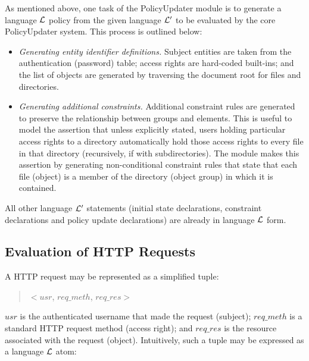 \documentclass[11pt]{report}
\begin{document}
        As mentioned above, one task of the PolicyUpdater module is to
        generate a language ${\cal L}$ policy from the given language
        ${\cal L'}$ to be evaluated by the core PolicyUpdater system.
        This process is outlined below:

        \begin{itemize}
          \item
            {\em Generating entity identifier definitions.} Subject entities are
            taken from the authentication (password) table; access rights are
            hard-coded built-ins; and the list of objects are generated by
            traversing the document root for files and directories.
          \item
            {\em Generating additional constraints.} Additional constraint
            rules are generated to preserve the relationship between groups
            and elements. This is useful to model the assertion that unless
            explicitly stated, users holding particular access rights to a
            directory automatically hold those access rights to every file in
            that directory (recursively, if with subdirectories). The module
            makes this assertion by generating non-conditional constraint rules
            that state that each file (object) is a member of the directory
            (object group) in which it is contained.
        \end{itemize}

        All other language ${\cal L'}$ statements (initial state declarations,
        constraint declarations and policy update declarations) are already in
        language ${\cal L}$ form.

      \subsection{Evaluation of HTTP Requests}
        \label{subs-polup-httpr}

         A HTTP request may be represented as a simplified tuple:

         \begin{quote}
           $<$$usr$, $req\_meth$, $req\_res$$>$
         \end{quote}

         $usr$ is the authenticated username that made the request (subject);
         $req\_meth$ is a standard HTTP request method (access right); and
         $req\_res$ is the resource associated with the request (object).
         Intuitively, such a tuple may be expressed as a language ${\cal L}$
         atom:
\end{document}
